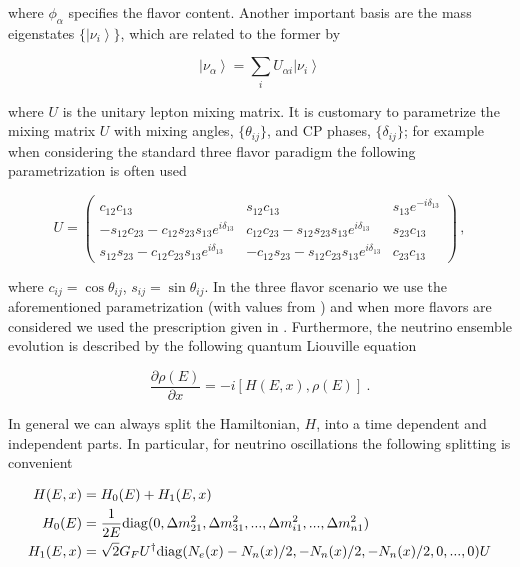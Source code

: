 \documentclass[3p,12pt,authoryear]{elsarticle}
\newcommand{\ket}[1]{\ensuremath{\left|#1\right\rangle}}
\newcommand{\pa}[2]{\frac{\partial #1}{\partial #2}}
\begin{document}
where $\phi_\alpha$ specifies the flavor content. Another important basis are the mass eigenstates $\{ \ket{\nu_i}  \}$, which are related to the former by

\begin{equation}
\ket{\nu_\alpha} = \sum_i U_{\alpha i} \ket{\nu_i} 
\label{eq:changebasis}
\end{equation}

where $U$ is the unitary lepton mixing matrix. It is customary to parametrize the mixing matrix $U$ with mixing angles, $\{\theta_{ij}\}$, and CP phases, $\{ \delta_{ij} \}$; for example when considering the standard three flavor paradigm the following parametrization is often used

\begin{equation}
U
=
\begin{pmatrix}
c_{12} c_{13} & s_{12} c_{13} & s_{13} e^{-i\delta_{13}} \\ 
- s_{12} c_{23} - c_{12} s_{23} s_{13} e^{i\delta_{13}} & c_{12} c_{23} - s_{12} s_{23} s_{13} e^{i\delta_{13}} & s_{23} c_{13} \\
s_{12}s_{23} -c_{12}c_{23}s_{13}e^{i\delta_{13}} & - c_{12} s_{23} - s_{12} c_{23} s_{13} e^{i\delta_{13}} & c_{23} c_{13}
\end{pmatrix}
\,,
\label{eq:U}
\end{equation}

where $c_{ij} = \cos \theta_{ij}$, $s_{ij} = \sin \theta_{ij}$. In the three flavor scenario we use the aforementioned parametrization (with values from \citep{Gonzalez-Garcia:2014bfa}) and when more flavors are considered we used the prescription given in \citet{SQUIDS}. Furthermore, the neutrino ensemble evolution is described by the following quantum Liouville equation

\begin{equation}
\pa{\rho(E)}{x} = -i [ H (E,x), \rho(E) ]~.
\label{eq:schrodinger}
\end{equation}

In general we can always split the Hamiltonian, $H$, into a time dependent and independent parts. In particular, for neutrino oscillations the following splitting is convenient

\begin{subequations}
\label{eq:hamiltonian}
\begin{align}
H(E,x) &= H_0(E)  + H_{1}(E,x) \\
H_0 (E) &= \frac{1}{2E} {\rm diag}( 0 , \Delta m^2_{21},\Delta m^2_{31},...,\Delta m^2_{i1},...,\Delta m^2_{n1}) \label{eq:h0} \\
H_1 (E,x) &= \sqrt{2} G_F U^\dagger {\rm diag} ( N_e(x) - N_n(x)/2, -N_n(x)/2, -N_n(x)/2 , 0,...,0 )U\label{eq:hi} 
\end{align}
\end{subequations}
\end{document}
